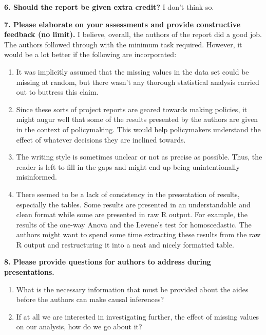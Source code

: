 \documentclass[]{article}
\begin{document}
\textbf{6. Should the report be given extra credit?} I don't think so.

\textbf{7. Please elaborate on your assessments and provide constructive
feedback (no limit).} I believe, overall, the authors of the report did
a good job. The authors followed through with the minimum task required.
However, it would be a lot better if the following are incorporated:

\begin{enumerate}
\def\labelenumi{\arabic{enumi}.}
\item
  It was implicitly assumed that the missing values in the data set
  could be missing at random, but there wasn't any thorough statistical
  analysis carried out to buttress this claim.
\item
  Since these sorts of project reports are geared towards making
  policies, it might augur well that some of the results presented by
  the authors are given in the context of policymaking. This would help
  policymakers understand the effect of whatever decisions they are
  inclined towards.
\item
  The writing style is sometimes unclear or not as precise as possible.
  Thus, the reader is left to fill in the gaps and might end up being
  unintentionally misinformed.
\item
  There seemed to be a lack of consistency in the presentation of
  results, especially the tables. Some results are presented in an
  understandable and clean format while some are presented in raw R
  output. For example, the results of the one-way Anova and the Levene's
  test for homoscedastic. The authors might want to spend some time
  extracting these results from the raw R output and restructuring it
  into a neat and nicely formatted table.
\end{enumerate}

\textbf{8. Please provide questions for authors to address during
presentations.}

\begin{enumerate}
\def\labelenumi{\arabic{enumi}.}
\item
  What is the necessary information that must be provided about the
  aides before the authors can make causal inferences?
\item
  If at all we are interested in investigating further, the effect of
  missing values on our analysis, how do we go about it?
\end{enumerate}
\end{document}
